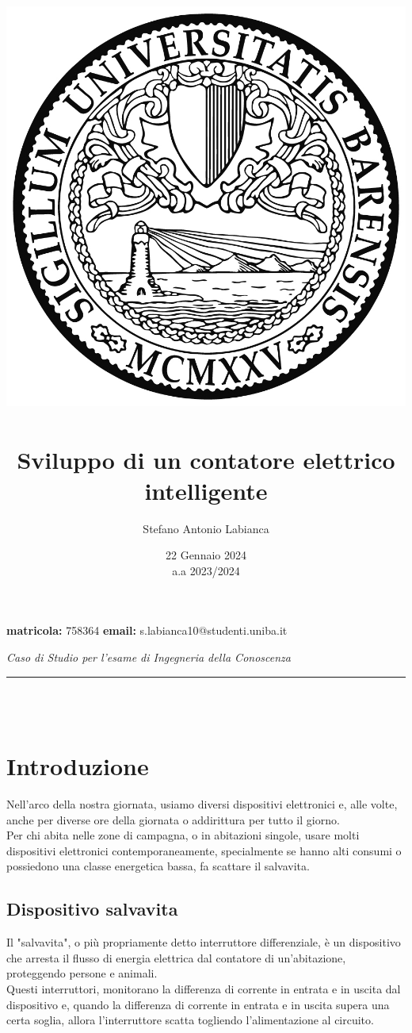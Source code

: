 \documentclass[12pt, letterpaper]{article}
\title{
    \includegraphics[scale=0.5]{unibalogo.jpg}~\\[1cm]
    \textbf{Sviluppo di un contatore elettrico intelligente}
}
\author{Stefano Antonio Labianca}
\date{22 Gennaio 2024 \\[0.125cm] a.a 2023/2024}
\begin{document}
\maketitle


\textbf{matricola: } 758364
\hfill
\textbf{email: } s.labianca10@studenti.uniba.it
\hfill \\
\begin{center}
      \textit{Caso di Studio per l'esame di Ingegneria della Conoscenza}
\end{center}


\par\noindent\rule{\textwidth}{0.4pt}~\\[5cm]

\tableofcontents ~\\[5cm]

\section{Introduzione}

Nell'arco della nostra giornata, usiamo diversi dispositivi elettronici e,
alle volte, anche per diverse ore della giornata o addirittura per tutto
il giorno. \\ \break
Per chi abita nelle zone di campagna, o in abitazioni singole, usare molti
dispositivi elettronici contemporaneamente, specialmente se hanno alti consumi o
possiedono una classe energetica bassa, fa scattare il salvavita.

\subsection{Dispositivo salvavita}

Il "salvavita", o più propriamente detto interruttore differenziale, è un dispositivo
che arresta il flusso di energia elettrica dal contatore di
un'abitazione, proteggendo persone e animali. \\ \break
Questi interruttori, monitorano la differenza di corrente in entrata
e in uscita dal dispositivo e, quando la differenza di corrente in entrata e in
uscita supera una certa soglia, allora l'interruttore scatta togliendo l'alimentazione
al circuito.
\end{document}
